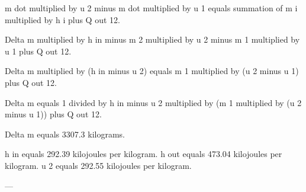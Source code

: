 m dot multiplied by u 2 minus m dot multiplied by u 1 equals summation of m i multiplied by h i plus Q out 12.  

Delta m multiplied by h in minus m 2 multiplied by u 2 minus m 1 multiplied by u 1 plus Q out 12.  

Delta m multiplied by (h in minus u 2) equals m 1 multiplied by (u 2 minus u 1) plus Q out 12.  

Delta m equals 1 divided by h in minus u 2 multiplied by (m 1 multiplied by (u 2 minus u 1)) plus Q out 12.  

Delta m equals 3307.3 kilograms.  

h in equals 292.39 kilojoules per kilogram.  
h out equals 473.04 kilojoules per kilogram.  
u 2 equals 292.55 kilojoules per kilogram.  

---